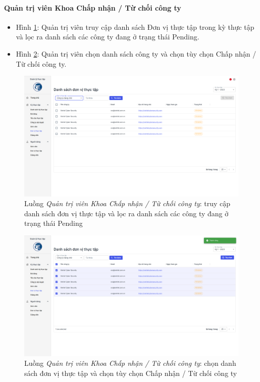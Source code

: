 \documentclass[./../main.tex]{subfiles}
\begin{document}
\paragraph*{Quản trị viên Khoa Chấp nhận / Từ chối công ty}

\begin{itemize}
	\item Hình \ref{fig:org_admin_access_list_intern_partners}: Quản trị viên truy cập danh sách Đơn vị thực tập trong kỳ thực tập và lọc ra danh sách các công ty đang ở trạng thái Pending. 
	\item Hình \ref{fig:org_admin_select_partners}: Quản trị viên chọn danh sách công ty và chọn tùy chọn Chấp nhận / Từ chối công ty.
\end{itemize}

\begin{figure}[]
	\includegraphics[width=\linewidth]{./images/image79.png}
	\caption{Luồng \emph{Quản trị viên Khoa Chấp nhận / Từ chối công ty}: truy cập danh sách đơn vị thực tập và lọc ra danh sách các công ty đang ở trạng thái Pending}
	\label{fig:org_admin_access_list_intern_partners}
\end{figure}

\begin{figure}[]
	\includegraphics[width=\linewidth]{./images/image80.png}
	\caption{Luồng \emph{Quản trị viên Khoa Chấp nhận / Từ chối công ty}: chọn danh sách đơn vị thực tập và chọn tùy chọn Chấp nhận / Từ chối công ty}
	\label{fig:org_admin_select_partners}
\end{figure}
\end{document}

